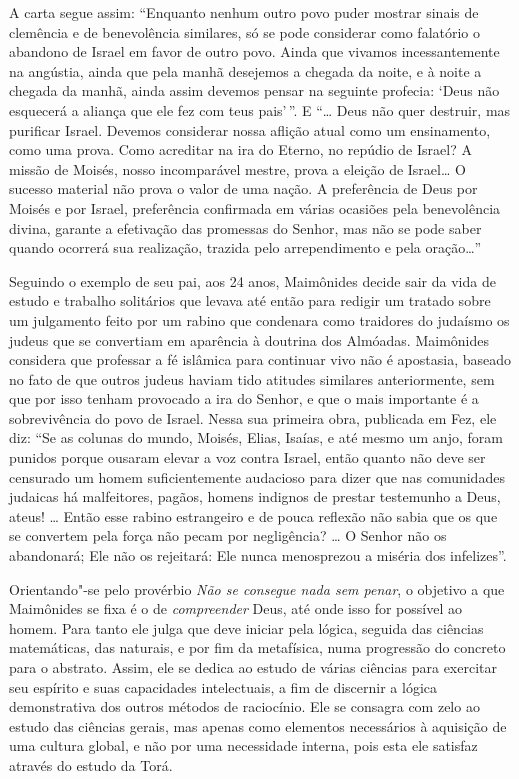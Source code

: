 A carta segue assim: ``Enquanto nenhum
outro povo puder mostrar sinais de clemência e de benevolência
similares, só se pode considerar como falatório o abandono de Israel em
favor de outro povo. Ainda que vivamos incessantemente na angústia,
ainda que pela manhã desejemos a chegada da noite, e à noite a chegada
da manhã, ainda assim devemos pensar na seguinte profecia: `Deus não
esquecerá a aliança que ele fez com teus pais'\,''. E ``\ldots{} Deus não 
quer destruir, mas purificar Israel. Devemos considerar nossa aflição atual 
como um ensinamento, como uma prova. Como acreditar na ira do Eterno, no 
repúdio de Israel? A missão de Moisés, nosso incomparável mestre, prova a 
eleição de Israel\ldots{} O sucesso material não prova o valor de uma nação. 
A preferência de Deus por Moisés e por Israel, preferência confirmada em 
várias ocasiões pela benevolência divina, garante a efetivação das promessas 
do Senhor, mas não se pode saber quando ocorrerá sua realização, trazida 
pelo arrependimento e pela oração\ldots{}''

Seguindo o exemplo de seu pai, aos 24 anos, Maimônides decide sair da
vida de estudo e trabalho solitários que levava até então para
redigir um tratado sobre um julgamento feito por um rabino que condenara
como traidores do judaísmo os judeus que se convertiam em aparência à
doutrina dos Almóadas. Maimônides considera que professar a fé
islâmica para continuar vivo não é apostasia, baseado no fato de que 
outros judeus haviam tido
atitudes similares anteriormente, sem que por isso tenham provocado a
ira do Senhor, e que o mais importante é a sobrevivência do povo de
Israel. Nessa sua primeira obra, publicada em Fez, ele diz: ``Se as
colunas do mundo, Moisés, Elias, Isaías, e até mesmo um anjo, foram
punidos porque ousaram elevar a voz contra Israel, então quanto não
deve ser censurado um homem suficientemente audacioso para dizer que
nas comunidades judaicas há malfeitores, pagãos, homens indignos de
prestar testemunho a Deus, ateus! \ldots{} Então esse rabino estrangeiro e de
pouca reflexão não sabia que os que se convertem pela força não pecam
por negligência? \ldots{} O Senhor não os abandonará; Ele não os rejeitará:
Ele nunca menosprezou a miséria dos infelizes''.

Orientando"-se pelo provérbio \emph{Não se consegue nada sem penar}, o
objetivo a que Maimônides se fixa é o de \emph{compreender} Deus, até onde
isso for possível ao homem. Para tanto ele julga que deve iniciar pela
lógica, seguida das ciências matemáticas, das naturais, e por fim da
metafísica, numa progressão do concreto para o abstrato. Assim, ele se
dedica ao estudo de várias ciências para exercitar seu espírito e suas
capacidades intelectuais, a fim de discernir a lógica demonstrativa dos
outros métodos de raciocínio. Ele se consagra com zelo ao estudo das
ciências gerais, mas apenas como elementos necessários à aquisição de
uma cultura global, e não por uma necessidade interna, pois esta ele
satisfaz através do estudo da Torá.

